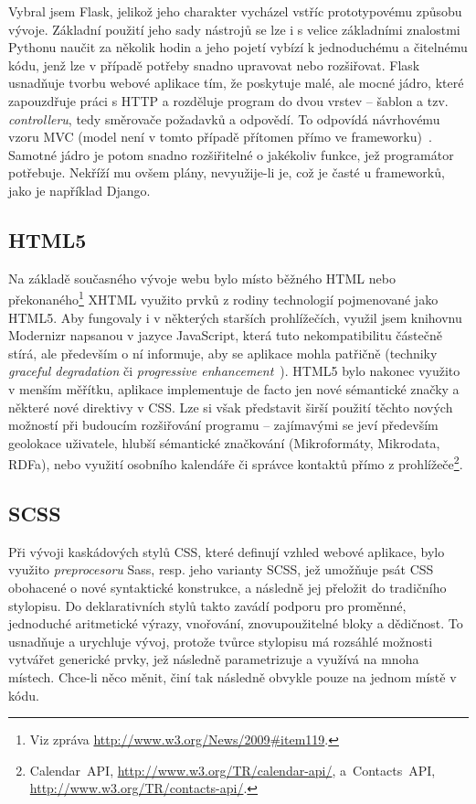 \documentclass[12pt,oneside,final]{fithesis2}
\begin{document}
Vybral jsem  Flask, jelikož jeho charakter vycházel vstříc prototypovému způsobu vývoje. Základní použití jeho sady nástrojů se lze i s velice základními znalostmi Pythonu naučit za několik hodin a jeho pojetí vybízí k jednoduchému a čitelnému kódu, jenž lze v případě potřeby snadno upravovat nebo rozšiřovat. Flask usnadňuje tvorbu webové aplikace tím, že poskytuje malé, ale mocné jádro, které zapouzdřuje práci s HTTP a rozděluje program do dvou vrstev -- šablon a tzv. \emph{controlleru}, tedy směrovače požadavků a odpovědí. To odpovídá návrhovému vzoru MVC (model není v tomto případě přítomen přímo ve frameworku)~\cite{bernard2009serial}. Samotné jádro je potom snadno rozšiřitelné o jakékoliv funkce, jež programátor potřebuje. Nekříží mu ovšem plány, nevyužije-li je, což je časté u  frameworků, jako je například Django.

\subsection{HTML5}
Na základě současného vývoje webu bylo místo běžného HTML nebo překonaného\footnote{Viz zpráva \url{http://www.w3.org/News/2009\#item119}.} XHTML využito prvků z rodiny technologií pojmenované jako HTML5. Aby fungovaly i v některých starších prohlížečích, využil jsem knihovnu Modernizr napsanou v jazyce JavaScript, která tuto nekompatibilitu částečně stírá, ale především o ní informuje, aby se aplikace mohla patřičně  (techniky \emph{graceful degradation} či \emph{progressive enhancement}~\cite{heilmann2009graceful}). HTML5 bylo nakonec využito v menším měřítku, aplikace implementuje de facto jen nové sémantické značky a některé nové direktivy v CSS. Lze si však představit širší použití těchto nových možností při budoucím rozšiřování programu -- zajímavými se jeví především geolokace uživatele, hlubší sémantické značkování (Mikroformáty, Mikrodata, RDFa), nebo využití osobního kalendáře či správce kontaktů přímo z prohlížeče\footnote{Calendar~API, \url{http://www.w3.org/TR/calendar-api/}, a~Contacts~API, \url{http://www.w3.org/TR/contacts-api/}.}.

\subsection{SCSS}
Při vývoji kaskádových stylů CSS, které definují vzhled webové aplikace, bylo využito \emph{preprocesoru} Sass, resp. jeho varianty SCSS, jež umožňuje psát CSS obohacené o nové syntaktické konstrukce, a následně jej přeložit do tradičního stylopisu. Do deklarativních stylů takto zavádí podporu pro proměnné, jednoduché aritmetické výrazy, vnořování, znovupoužitelné bloky a dědičnost. To usnadňuje a urychluje vývoj, protože tvůrce stylopisu má rozsáhlé možnosti vytvářet generické prvky, jež následně parametrizuje a využívá na mnoha místech. Chce-li něco měnit, činí tak následně obvykle pouze na jednom místě v kódu.
\end{document}
